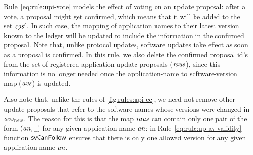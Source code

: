 \clearpage

Rule~\ref{eq:rule:upi-vote} models the effect of voting on an update proposal:
after a vote, a proposal might get confirmed, which means that it will be added
to the set $\mathit{cps'}$. In such case, the mapping of application names to
their latest version known to the ledger will be updated to include the
information in the confirmed proposal. Note that, unlike protocol updates,
software updates take effect as soon as a proposal is confirmed. In this rule,
we also delete the confirmed proposal id's from the set of registered
application update proposals ($\mathit{raus}$), since this information is no
longer needed once the application-name to software-version map ($\mathit{avs}$)
is updated.

Also note that, unlike the rules of \cref{fig:rules:upi-ec}, we need not remove
other update proposals that refer to the software names whose versions were
changed in $\mathit{avs_{new}}$. The reason for this is that the map $\mathit{raus}$
can contain only one pair of the form $(\var{an}, \wcard)$ for any given
application name $\mathit{an}$: in Rule~\ref{eq:rule:up-av-validity} function
$\mathsf{svCanFollow}$ ensures that there is only one allowed version for any
given application name $\mathit{an}$.


